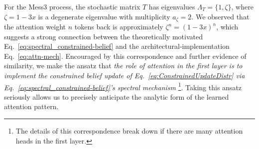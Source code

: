 \documentclass{article}
\theoremstyle{plain}
\theoremstyle{definition}
\theoremstyle{remark}
\begin{document}
For the Mess3 process, the stochastic matrix $T$ has 
eigenvalues $\Lambda_T = \{ 1, \zeta \}$,
where $\zeta = 1-3x$ is a degenerate eigenvalue with multiplicity $a_\zeta = 2$.
We observed that the attention weight $n$ tokens back is approximately $\zeta^n = (1 - 3x)^n$,
which suggests a strong connection between the theoretically motivated Eq.~\eqref{eq:spectral_constrained-belief} and the architectural-implementation Eq.~\eqref{eq:attn-mech}. 
Encouraged by this correspondence and further evidence of similarity, 
we make the ansatz that 
\emph{the role of attention in the first layer is to implement the constrained belief update of Eq.~\eqref{eq:ConstrainedUpdateDistr}
via Eq.~\eqref{eq:spectral_constrained-belief}'s spectral mechanism}
\footnote{The details of this correspondence break down if there are many attention heads in the first layer.}.
Taking this ansatz seriously allows us to precisely anticipate the analytic form of the learned attention pattern.
\end{document}
